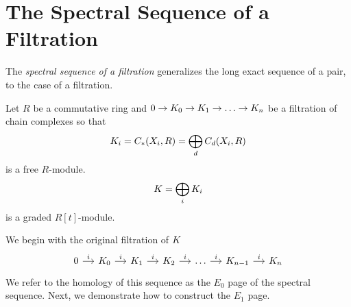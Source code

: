 \section{The Spectral Sequence of a Filtration}
The \emph{spectral sequence of a filtration} generalizes the long exact sequence of a pair, to the case of a filtration.

Let $R$ be a commutative ring and $0 \rightarrow K_0 \rightarrow K_1 \rightarrow  \ldots \rightarrow  K_n$ 
be a filtration of chain complexes so that \[ K_i = C_*(X_i, R) = \bigoplus_d C_d(X_i, R)\] is a free $R$-module.
\[ K = \bigoplus_i K_i \] is a graded $R[t]$-module.

\noindent We begin with the original filtration of $K$
\[
\begin{tikzcd} [column sep=small]
0 \arrow{r}{i} & \K_0 \arrow{r}{i} & \K_1 \arrow{r}{i}   & \K_2 \arrow{r}{i} & \ldots \arrow{r}{i} & \K_{n-1} \arrow{r}{i} & \K_n
\end{tikzcd}
\]
We refer to the homology of this sequence as the $E_0$ page of the spectral sequence. Next, we demonstrate how to construct the $E_1$ page.

